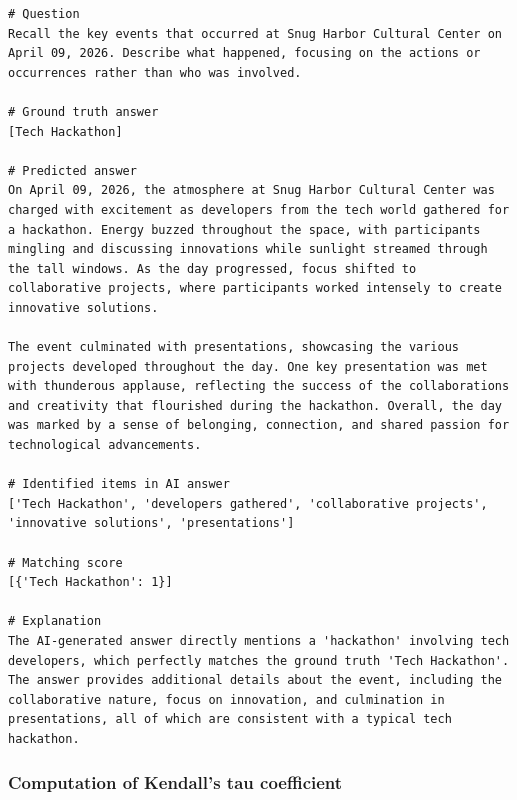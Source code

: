 \documentclass{article}
\begin{document}
\begin{lstlisting}[style=mystyle, caption={Example with correct answer provided by GPT-4o mini (on the document with 20 events produced by Claude 3.5 Sonnet), which however gives more identified items than the ground truth. In this case, we are lenient in the number of predictions, resulting in F1=1, as detailed in Sec.~\ref{app:evaluation_F1_score}.}, label={lst:evaluation_issue}]
# Question
Recall the key events that occurred at Snug Harbor Cultural Center on April 09, 2026. Describe what happened, focusing on the actions or occurrences rather than who was involved.

# Ground truth answer
[Tech Hackathon]

# Predicted answer
On April 09, 2026, the atmosphere at Snug Harbor Cultural Center was charged with excitement as developers from the tech world gathered for a hackathon. Energy buzzed throughout the space, with participants mingling and discussing innovations while sunlight streamed through the tall windows. As the day progressed, focus shifted to collaborative projects, where participants worked intensely to create innovative solutions. 

The event culminated with presentations, showcasing the various projects developed throughout the day. One key presentation was met with thunderous applause, reflecting the success of the collaborations and creativity that flourished during the hackathon. Overall, the day was marked by a sense of belonging, connection, and shared passion for technological advancements.

# Identified items in AI answer
['Tech Hackathon', 'developers gathered', 'collaborative projects', 'innovative solutions', 'presentations']

# Matching score
[{'Tech Hackathon': 1}]

# Explanation
The AI-generated answer directly mentions a 'hackathon' involving tech developers, which perfectly matches the ground truth 'Tech Hackathon'. The answer provides additional details about the event, including the collaborative nature, focus on innovation, and culmination in presentations, all of which are consistent with a typical tech hackathon.
\end{lstlisting}


\subsubsection{Computation of Kendall's tau coefficient}\label{app:evaluation_Kendall_tau}
\end{document}
